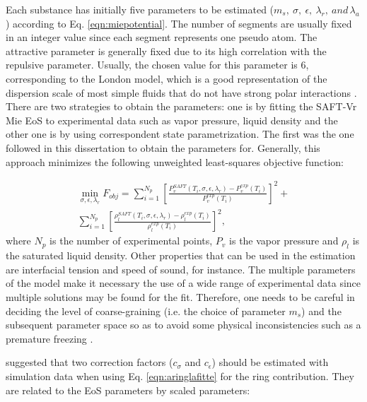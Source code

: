     Each substance has initially five parameters to be estimated ($m_s,\ \sigma,\ \epsilon,\ \lambda_{r},\ and \, \lambda_{a}$) according to Eq. \eqref{eqn:miepotential}. The number of segments are usually fixed in an integer value since each segment represents one pseudo atom. The attractive parameter is generally  fixed due to its  high correlation with the repulsive parameter. Usually, the chosen value for this parameter is 6, corresponding to the London model, which is a good representation of the dispersion scale of most simple fluids that do not have strong polar interactions \cite{ramrattan2015,herdes2015}. There are two strategies to obtain the parameters: one is by fitting the SAFT-Vr Mie EoS to experimental data such as vapor pressure, liquid density and the other one is by using correspondent state parametrization. The first was the one followed in this dissertation to obtain the parameters for. Generally, this approach minimizes the following unweighted least-squares objective function:
    
    \begin{equation}
    \begin{aligned}
    \min\limits_{\sigma,\epsilon,\lambda_{r}} F_{obj}= \sum_{i=1}^{N_{p}} \left[\frac{P_{v}^{SAFT}(T_{i},\sigma,\epsilon,\lambda_{r})-P_{v}^{exp}(T_{i})}{P_{v}^{exp}(T_{i})} \right]^2 +\\
    \sum_{i=1}^{N_{p}} \left[\frac{\rho_{l}^{SAFT}(T_{i},\sigma,\epsilon,\lambda_{r})-\rho_{l}^{exp}(T_{i})}{\rho_{l}^{exp}(T_{i})} \right]^2 ,
    \end{aligned}
    \label{eqn:fobj}
    \end{equation}
    where $N_{p}$ is the number of experimental points, $P_{v}$ is the vapor pressure and $\rho_{l}$ is the saturated liquid density. Other properties that can be used in the estimation are interfacial tension and speed of sound, for instance. The multiple parameters of the model make it necessary the use of a wide range of experimental data since multiple solutions may be found for the fit. Therefore, one needs to be careful in deciding the level of coarse-graining (i.e. the choice of parameter $m_{s}$) and the subsequent parameter space so as to avoid some physical inconsistencies such as a premature freezing \cite{lobanova2015}.
    
     suggested that two correction factors ($c_{\sigma}$ and $c_{\epsilon}$) should be estimated with simulation data when using Eq. \eqref{eqn:aringlafitte} for the ring contribution. They are related to the EoS parameters by scaled parameters:
    

